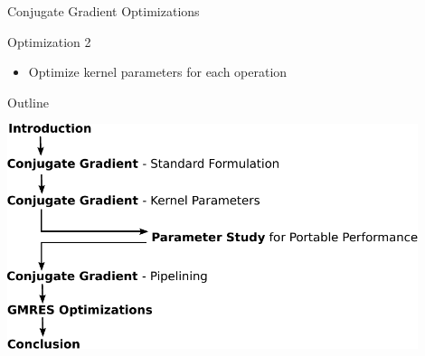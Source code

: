 \begin{frame}[fragile]{Conjugate Gradient Optimizations}

 \begin{block}{Optimization 2}
   \begin{itemize}
   \item Optimize kernel parameters for each operation
  \end{itemize}
 \end{block}
   
\end{frame}


\begin{frame}{Outline}
 \begin{center}
  \includegraphics[width=0.9\textwidth]{figures/outline}
 \end{center}
\end{frame}
